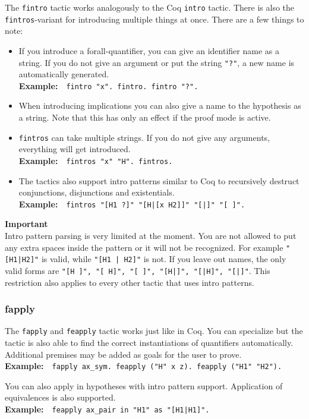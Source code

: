 \documentclass[12pt, a4paper]{article}
\newcommand{\coq}[1]{\texttt{#1}}
\newcommand{\important}[1]{
	\vspace{3pt}
	\begin{boximportant}
		\parbox{\textwidth}{\textcolor{colorimportant}{\textbf{Important}\\#1}}
	\end{boximportant}}
\newcommand{\example}[1]{\medskip\\\textbf{Example:}~~#1}
\begin{document}
The \texttt{fintro} tactic works analogously to the Coq \texttt{intro} tactic. 
There is also the \texttt{fintros}-variant for introducing multiple things at once. 
There are a few things to note:
\begin{itemize}
	\item 
	If you introduce a forall-quantifier, you can give an identifier name as a string. 
	If you do not give an argument or put the string \coq{"?"}, a new name is automatically generated.
	\example{\coq{fintro "x". fintro. fintro "?".}}
	
	\item
	When introducing implications you can also give a name to the hypothesis as a string. 
	Note that this has only an effect if the proof mode is active.
	
	\item 
	\texttt{fintros} can take multiple strings. 
	If you do not give any arguments, everything will get introduced.
	\example{\coq{fintros "x" "H". fintros.}}
	
	\item
	The tactics also support intro patterns similar to Coq to recursively destruct conjunctions, disjunctions and existentials.
	\example{\coq{fintros "[H1 ?]" "[H|[x H2]]" "[|]" "[ ]".}}
\end{itemize}
\label{todo-intro-pattern-parsing}\important{Intro pattern parsing is very limited at the moment. You are not allowed to put any extra spaces inside the pattern or it will not be recognized. For example \texttt{"[H1|H2]"} is valid, while \texttt{"[H1 | H2]"} is not. If you leave out names, the only valid forms are \texttt{"[H ]", "[ H]", "[ ]", "[H|]", "[|H]", "[|]"}. This restriction also applies to every other tactic that uses intro patterns.}



\subsubsection{\ttfamily fapply}

The \texttt{fapply} and \texttt{feapply} tactic works just like in Coq. 
You can specialize but the tactic is also able to find the correct instantiations of quantifiers automatically. Additional premises may be added as goals for the user to prove.
\example{\coq{fapply ax_sym. feapply ("H" x z). feapply ("H1" "H2").}}

\medskip\noindent
You can also apply in hypotheses with intro pattern support. Application of equivalences is also supported.
\example{\coq{feapply ax_pair in "H1" as "[H1|H1]".}}
\end{document}
